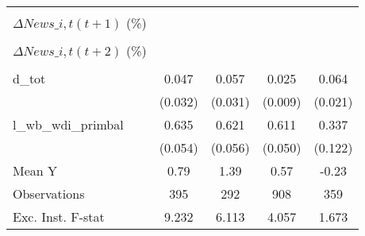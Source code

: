 {\begin{tabular}{l*{4}{c}}
                    &                     &                     &                     &                     \\
\addlinespace
$ \Delta News\_{i,t}(t+1)$ (\%)&                     &                     &                     &                     \\
                    &                     &                     &                     &                     \\
\addlinespace
$ \Delta News\_{i,t}(t+2)$ (\%)&                     &                     &                     &                     \\
                    &                     &                     &                     &                     \\
\addlinespace
d\_tot               &       0.047         &       0.057\sym{*}  &       0.025\sym{***}&       0.064\sym{***}\\
                    &     (0.032)         &     (0.031)         &     (0.009)         &     (0.021)         \\
\addlinespace
l\_wb\_wdi\_primbal    &       0.635\sym{***}&       0.621\sym{***}&       0.611\sym{***}&       0.337\sym{***}\\
                    &     (0.054)         &     (0.056)         &     (0.050)         &     (0.122)         \\
\midrule
Mean Y              &        0.79         &        1.39         &        0.57         &       -0.23         \\
Observations        &         395         &         292         &         908         &         359         \\
Exc. Inst. F-stat   &       9.232         &       6.113         &       4.057         &       1.673         \\
\bottomrule
\end{tabular}
}
